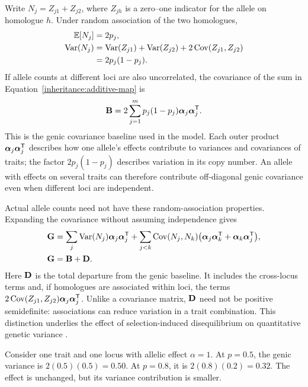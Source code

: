 Write $N_j=Z_{j1}+Z_{j2}$, where $Z_{jh}$ is a zero--one indicator for the
allele on homologue $h$. Under random association of the two homologues,
\begin{align}
  \mathbb E[N_j]&=2p_j,\\
  \operatorname{Var}(N_j)
    &=\operatorname{Var}(Z_{j1})+\operatorname{Var}(Z_{j2})
       +2\operatorname{Cov}(Z_{j1},Z_{j2})\\
    &=2p_j(1-p_j).
\end{align}
If allele counts at different loci are also uncorrelated, the covariance
of the sum in Equation~\eqref{inheritance:additive-map} is
\begin{equation}
  \mathbf{B}=2\sum_{j=1}^{m}p_j(1-p_j)
                       \boldsymbol{\alpha}_j\boldsymbol{\alpha}_j^{\mathsf T}.
  \label{inheritance:genic-formula}
\end{equation}
This is the genic covariance baseline used in the model. Each outer product
$\boldsymbol{\alpha}_j\boldsymbol{\alpha}_j^{\mathsf T}$ describes how one allele's effects
contribute to variances and covariances of traits; the factor
$2p_j(1-p_j)$ describes variation in its copy number. An allele with effects
on several traits can therefore contribute off-diagonal genic covariance
even when different loci are independent.

Actual allele counts need not have these random-association properties.
Expanding the covariance without assuming independence gives
\begin{align}
  \mathbf{G}
    &=\sum_j\operatorname{Var}(N_j)\boldsymbol{\alpha}_j\boldsymbol{\alpha}_j^{\mathsf T}
      +\sum_{j<k}\operatorname{Cov}(N_j,N_k)
       \bigl(\boldsymbol{\alpha}_j\boldsymbol{\alpha}_k^{\mathsf T}
            +\boldsymbol{\alpha}_k\boldsymbol{\alpha}_j^{\mathsf T}\bigr),\\
  \mathbf{G}&=\mathbf{B}+\mathbf{D}.
  \label{inheritance:association-decomposition}
\end{align}
Here $\mathbf{D}$ is the total departure from the genic baseline. It includes
the cross-locus terms and, if homologues are associated within loci, the
terms $2\operatorname{Cov}(Z_{j1},Z_{j2})\boldsymbol{\alpha}_j\boldsymbol{\alpha}_j^{\mathsf T}$.
Unlike a covariance matrix, $\mathbf{D}$ need not be positive semidefinite:
associations can reduce variation in a trait combination. This distinction
underlies the effect of selection-induced disequilibrium on quantitative
genetic variance \citep{Bulmer1971,Bulmer1974}.

\begin{example}
  \label{inheritance:frequency-example}
  Consider one trait and one locus with allelic effect $\alpha=1$.
  At $p=0.5$, the genic variance is $2(0.5)(0.5)=0.50$.
  At $p=0.8$, it is $2(0.8)(0.2)=0.32$.
  The effect is unchanged, but its variance contribution is smaller.
\end{example}

